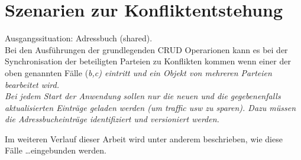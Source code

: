 \section{\label{sec:konfliktszenarien}Szenarien zur Konfliktentstehung}
Ausgangssituation: Adressbuch (shared).\\
Bei den Ausführungen der grundlegenden \gls{CRUD} Operarionen kann es bei der Synchronisation der beteiligten Parteien zu Konflikten kommen wenn einer der oben genannten Fälle (\it{b,c}) eintritt und ein Objekt von mehreren Parteien bearbeitet wird.\\
Bei jedem Start der Anwendung sollen nur die neuen und die gegebenenfalls aktualisierten Einträge geladen werden \it{(um traffic usw zu sparen)}. Dazu müssen die Adressbucheinträge identifiziert und versioniert werden.
%

%
Im weiteren Verlauf dieser Arbeit wird unter anderem beschrieben, wie diese Fälle \ldots  eingebunden werden.